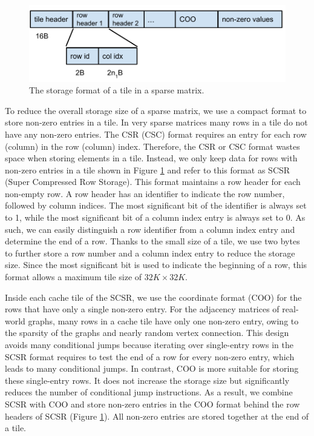 \begin{figure}
\centering
\includegraphics[scale=0.5]{SpMM_figs/tile_format.pdf}
\caption{The storage format of a tile in a sparse matrix.}
\label{tile_format}
\end{figure}

To reduce the overall storage size of a sparse matrix, we use a compact format
to store non-zero entries in a tile. In very sparse matrices
many rows in a tile do not have any non-zero entries.
The CSR (CSC) format requires an entry for each row (column) in the row
(column) index. Therefore, the CSR or CSC format wastes space when storing elements
in a tile. Instead, we only keep data for rows with non-zero entries in a tile
shown in Figure \ref{tile_format} and refer to this format as SCSR (Super
Compressed Row Storage). This format maintains a row header for each non-empty
row. A row header has an identifier to indicate the row number, followed by
column indices. 
The most significant bit of the identifier is always set to 1, while the most
significant bit of a column index entry is always set to 0. As such, we can easily
distinguish a row identifier from a column index entry and determine the end
of a row. Thanks to the small size of a tile, we use two bytes to further store a row
number and a column index entry to reduce the storage size. Since the most
significant bit is used to indicate the beginning of a row, this format allows
a maximum tile size of $32K \times 32K$.

Inside each cache tile of the SCSR, we use the coordinate format (COO) for
the rows that have only a single non-zero entry. For the adjacency matrices of
real-world graphs, many rows
in a cache tile have only one non-zero entry, owing to the sparsity of the graphs
and nearly random vertex connection. This design avoids many conditional jumps
because iterating over single-entry rows in the SCSR format requires to test
the end of a row for every non-zero entry, which leads to many conditional jumps.
In contrast, COO is more suitable for storing these
single-entry rows. It does not increase the storage size but significantly
reduces the number of conditional jump instructions. As a result, we combine
SCSR with COO and store non-zero entries in the COO format behind the row headers
of SCSR (Figure \ref{tile_format}). All non-zero entries are
stored together at the end of a tile.


